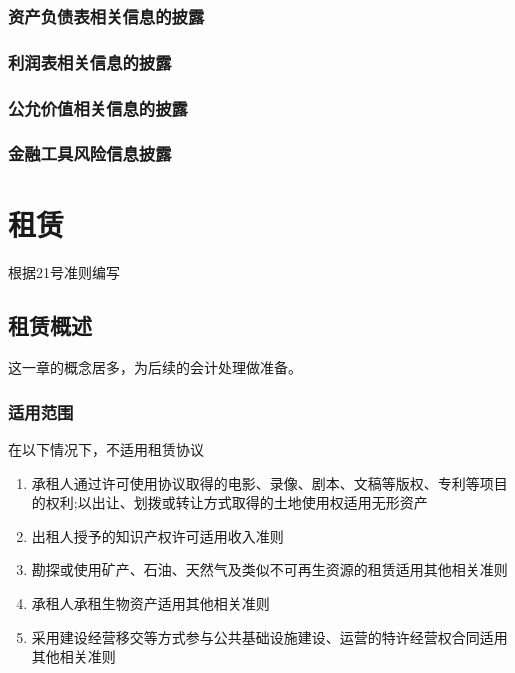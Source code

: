 \documentclass[UTF8,12pt]{ctexart}
\numberwithin{equation}{section} %
\numberwithin{figure}{section}
\numberwithin{table}{section}
\begin{document}
	\subsubsection{资产负债表相关信息的披露}
	\subsubsection{利润表相关信息的披露}
	\subsubsection{公允价值相关信息的披露}
	\subsubsection{金融工具风险信息披露}
	
	\newpage
	\section{租赁}
	根据21号准则编写
	\subsection{租赁概述}
	这一章的概念居多，为后续的会计处理做准备。
	\subsubsection{适用范围}
	在以下情况下，不适用租赁协议
	\begin{enumerate}
		\item 承租人通过许可使用协议取得的电影、录像、剧本、文稿等版权、专利等项目的权利;以出让、划拨或转让方式取得的土地使用权适用无形资产
		
		\item 出租人授予的知识产权许可适用收入准则
		
		\item 勘探或使用矿产、石油、天然气及类似不可再生资源的租赁适用其他相关准则
		
		\item 承租人承租生物资产适用其他相关准则
		
		\item 采用建设经营移交等方式参与公共基础设施建设、运营的特许经营权合同适用其他相关准则
	\end{enumerate}
	
\end{document}
